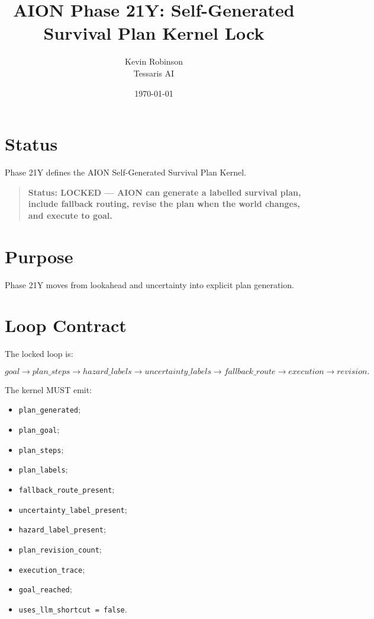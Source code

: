 \documentclass[11pt,a4paper]{article}
\title{\textbf{AION Phase 21Y: Self-Generated Survival Plan Kernel Lock}}
\author{Kevin Robinson\\Tessaris AI}
\date{\today}
\begin{document}
\maketitle

\section{Status}

Phase 21Y defines the AION Self-Generated Survival Plan Kernel.

\begin{quote}
\textbf{Status: LOCKED --- AION can generate a labelled survival plan, include fallback routing, revise the plan when the world changes, and execute to goal.}
\end{quote}

\section{Purpose}

Phase 21Y moves from lookahead and uncertainty into explicit plan generation.

\section{Loop Contract}

The locked loop is:

\[
goal
\rightarrow plan\_steps
\rightarrow hazard\_labels
\rightarrow uncertainty\_labels
\rightarrow fallback\_route
\rightarrow execution
\rightarrow revision.
\]

The kernel MUST emit:

\begin{itemize}
  \item \texttt{plan\_generated};
  \item \texttt{plan\_goal};
  \item \texttt{plan\_steps};
  \item \texttt{plan\_labels};
  \item \texttt{fallback\_route\_present};
  \item \texttt{uncertainty\_label\_present};
  \item \texttt{hazard\_label\_present};
  \item \texttt{plan\_revision\_count};
  \item \texttt{execution\_trace};
  \item \texttt{goal\_reached};
  \item \texttt{uses\_llm\_shortcut = false}.
\end{itemize}
\end{document}
